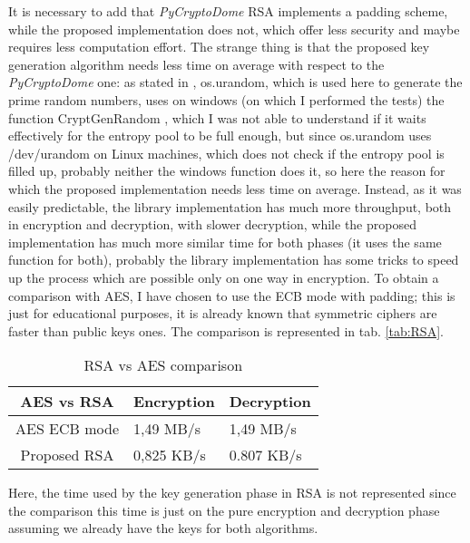 \documentclass{article}
\begin{document}
It is necessary to add that \textit{PyCryptoDome} RSA implements a padding scheme, while the proposed implementation does not, which offer less security and maybe requires less computation effort. The strange thing is that the proposed key generation algorithm needs less time on average with respect to the \textit{PyCryptoDome} one: as stated in \cite{pyrandom}, os.urandom, which is used here to generate the prime random numbers, uses on windows (on which I performed the tests) the function CryptGenRandom \cite{winRandom}, which I was not able to understand if it waits effectively for the entropy pool to be full enough, but since os.urandom uses /dev/urandom on Linux machines, which does not check if the entropy pool is filled up, probably neither the windows function does it, so here the reason for which the proposed implementation needs less time on average.\newline  
Instead, as it was easily predictable, the library implementation has much more throughput, both in encryption and decryption, with slower decryption, while the proposed implementation has much more similar time for both phases (it uses the same function for both), probably the library implementation has some tricks to speed up the process which are possible only on one way in encryption.\newline
To obtain a comparison with AES, I have chosen to use the ECB mode with padding; this is just for educational purposes, it is already known that symmetric ciphers are faster than public keys ones. The comparison is represented in tab. \ref{tab:RSA}.

\begin{table}[h]
	\begin{center}
		\begin{tabular}{ | c || m{2cm} | m{2cm} | }
			\hline
			AES vs RSA & Encryption & Decryption \\ [0.5ex] 
			\hline\hline
			AES ECB mode & 1,49 MB/s & 1,49 MB/s  \\ 
			\hline
			Proposed RSA & 0,825 KB/s & 0.807 KB/s \\ 
			\hline
		\end{tabular}
		\caption{RSA vs AES comparison}
		\label{tab:AES}
	\end{center}
\end{table}

Here, the time used by the key generation phase in RSA is not represented since the comparison this time is just on the pure encryption and decryption phase assuming we already have the keys for both algorithms.
\end{document}
